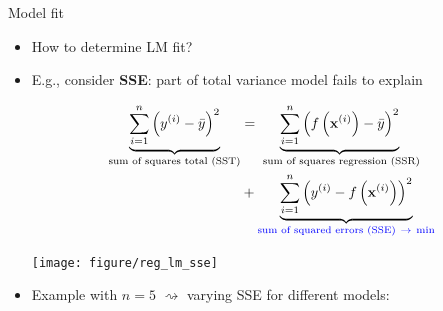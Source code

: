 \documentclass[11pt,compress,t,notes=noshow, xcolor=table]{beamer}
\begin{document}

\begin{frame}{Model fit}

\begin{itemize}
    \item How to determine LM fit?
    \item E.g., consider \textbf{SSE}: part of total 
    variance model fails to explain
    \begin{minipage}[b]{0.6\textwidth}
        \footnotesize
        \begin{align*}
            \underbrace{\sum\limits_{i=1}^n \left(y^{(i)} - \bar y\right)^2}_{\text{sum of 
            squares total (SST)}} &= 
            \underbrace{\sum\limits_{i=1}^n \left(f\left(\mathbf{x}^{(i)}\right) - \bar y\right)^2}_{\text{
            sum of squares regression (SSR)}} \\
            &+ \underbrace{\sum\limits_{i=1}^n \left(y^{(i)} - f\left(\mathbf{x}^{(i)}\right)\right)^2}_{\color{blue} 
            \text{sum of squared errors (SSE)} ~\rightarrow ~ \text{min}}
        \end{align*}
    \end{minipage}
    \begin{minipage}[b]{0.3\textwidth}
        \texttt{[image: figure/reg\_lm\_sse]}
    \end{minipage}
    \item Example with $n = 5$ $\rightsquigarrow$ varying SSE for 
    different models:
    \vfill
\end{itemize}

\end{frame}

\end{document}
